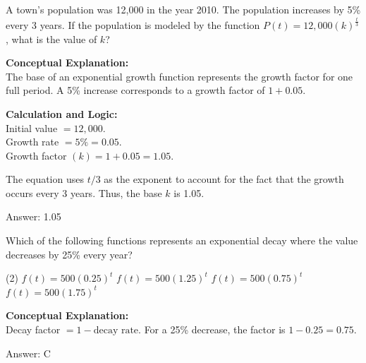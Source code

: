 \documentclass[11pt,paper=a4,answers]{exam}
\begin{document}
\begin{questions}

\question
A town's population was 12,000 in the year 2010. The population increases by 5\% every 3 years. If the population is modeled by the function $P(t) = 12,000(k)^{\frac{t}{3}}$, what is the value of $k$?

\begin{solution}
\textbf{Conceptual Explanation:} \\
The base of an exponential growth function represents the growth factor for one full period. A 5\% increase corresponds to a growth factor of $1 + 0.05$.

\vspace{20pt}

\textbf{Calculation and Logic:} \\
Initial value $= 12,000$. \\
Growth rate $= 5\% = 0.05$. \\
Growth factor $(k) = 1 + 0.05 = 1.05$.

\vspace{10pt}

The equation uses $t/3$ as the exponent to account for the fact that the growth occurs every 3 years. Thus, the base $k$ is 1.05.

\vspace{25pt}

Answer: \colorbox{yellow!100}{1.05}
\end{solution}

\vspace{40pt}

\question
Which of the following functions represents an exponential decay where the value decreases by 25\% every year?
\begin{tasks}(2)
    \task $f(t) = 500(0.25)^t$
    \task $f(t) = 500(1.25)^t$
    \task $f(t) = 500(0.75)^t$
    \task $f(t) = 500(1.75)^t$
\end{tasks}

\begin{solution}
\textbf{Conceptual Explanation:} \\
Decay factor $= 1 - \text{decay rate}$. For a 25\% decrease, the factor is $1 - 0.25 = 0.75$.

\vspace{25pt}

Answer: \colorbox{yellow!100}{C}
\end{solution}


\end{questions}
\end{document}
